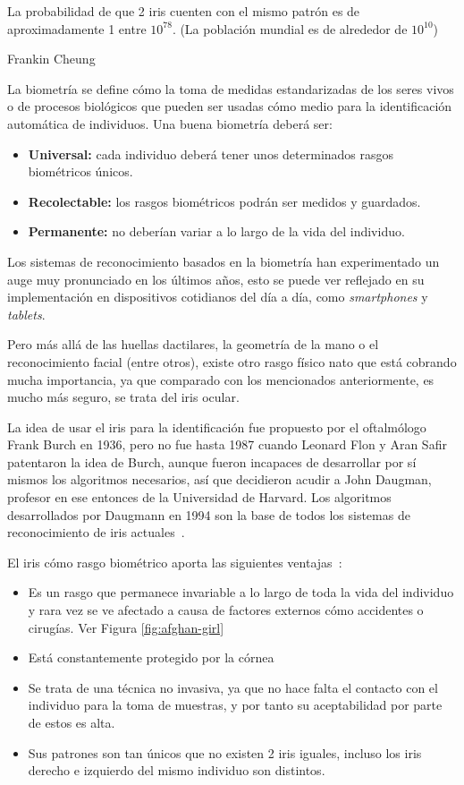 
\epigraph{La probabilidad de que 2 iris cuenten con el mismo patrón es de aproximadamente 1 entre $10^{78}$. (La población mundial es de alrededor de $10^{10}$)}{Frankin Cheung}

La biometría se define cómo la toma de medidas estandarizadas de los seres vivos o de procesos biológicos \cite{intro:bio-wiki} que pueden ser usadas cómo medio para la identificación automática de individuos. 
Una buena biometría deberá ser:
\begin{itemize}
	\item \textbf{Universal:} cada individuo deberá tener unos determinados rasgos biométricos únicos.
	\item \textbf{Recolectable:} los rasgos biométricos podrán ser medidos y guardados.
	\item \textbf{Permanente:} no deberían variar a lo largo de la vida del individuo.
\end{itemize}
Los sistemas de reconocimiento basados en la biometría han experimentado un auge muy pronunciado en los últimos años, esto se puede ver reflejado en su implementación en dispositivos cotidianos del día a día, como \emph{smartphones} y \emph{tablets}.

Pero más allá de las huellas dactilares, la geometría de la mano o el reconocimiento facial (entre otros), existe otro rasgo físico nato que está cobrando mucha importancia, ya que comparado con los mencionados anteriormente, es mucho más seguro, se trata del iris ocular.

La idea de usar el iris para la identificación fue propuesto por el oftalmólogo Frank Burch en 1936, pero no fue hasta 1987 cuando Leonard Flon y Aran Safir patentaron la idea de Burch, aunque fueron incapaces de desarrollar por sí mismos los algoritmos necesarios, así que decidieron acudir a John Daugman, profesor en ese entonces de la Universidad de Harvard.
Los algoritmos desarrollados por Daugmann en 1994 son la base de todos los sistemas de reconocimiento de iris actuales~\cite{shiren:2009}.

El iris cómo rasgo biométrico aporta las siguientes ventajas~\cite{biometrics:2015}:
\begin{itemize}
	\item Es un rasgo que permanece invariable a lo largo de toda la vida del individuo y rara vez se ve afectado a causa de factores externos cómo accidentes o cirugías. Ver Figura \ref{fig:afghan-girl}
	\item Está constantemente protegido por la córnea
	\item Se trata de una técnica no invasiva, ya que no hace falta el contacto con el individuo para la toma de muestras, y por tanto su aceptabilidad por parte de estos es alta.
	\item Sus patrones son tan únicos que no existen 2 iris iguales, incluso los iris derecho e izquierdo del mismo individuo son distintos.
\end{itemize}

